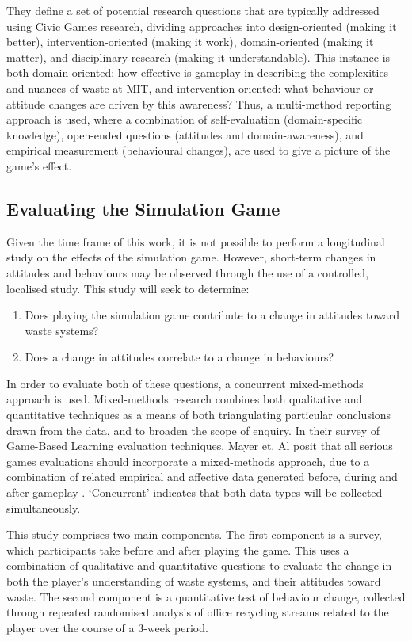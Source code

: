 \documentclass[nofonts,nols,justified,nobib]{tufte-book}
\begin{document}
They define a set of potential research questions that are typically addressed using Civic Games research, dividing approaches into design-oriented (making it better), intervention-oriented (making it work), domain-oriented (making it matter), and disciplinary research (making it understandable). This instance is both domain-oriented: how effective is gameplay in describing the complexities and nuances of waste at MIT, and intervention oriented: what behaviour or attitude changes are driven by this awareness? Thus, a multi-method reporting approach is used, where a combination of self-evaluation (domain-specific knowledge), open-ended questions (attitudes and domain-awareness), and empirical measurement (behavioural changes), are used to give a picture of the game's effect.


\subsection*{Evaluating the Simulation Game}

Given the time frame of this work, it is not possible to perform a longitudinal study on the effects of the simulation game. However, short-term changes in attitudes and behaviours may be observed through the use of a controlled, localised study. This study will seek to determine:
\begin{enumerate}
\item Does playing the simulation game contribute to a change in attitudes toward waste systems?
\item Does a change in attitudes correlate to a change in behaviours?
\end{enumerate}

In order to evaluate both of these questions, a concurrent mixed-methods approach is used. Mixed-methods research combines both qualitative and quantitative techniques as a means of both triangulating particular conclusions drawn from the data, and to broaden the scope of enquiry. In their survey of Game-Based Learning evaluation techniques, Mayer et. Al posit that all serious games evaluations should incorporate a mixed-methods approach, due to a combination of related empirical and affective data generated before, during and after gameplay \cite{mayer_research_2014}. `Concurrent' indicates that both data types will be collected simultaneously.

This study comprises two main components. The first component is a survey, which participants take before and after playing the game. This uses a combination of qualitative and quantitative questions to evaluate the change in both the player's understanding of waste systems, and their attitudes toward waste. The second component is a quantitative test of behaviour change, collected through repeated randomised analysis of office recycling streams related to the player over the course of a 3-week period.
\end{document}
